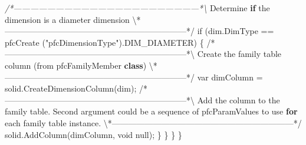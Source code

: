 \documentclass[]{article}
\newenvironment{Shaded}{}{}
\newcommand{\KeywordTok}[1]{\textcolor[rgb]{0.00,0.44,0.13}{\textbf{{#1}}}}
\newcommand{\FloatTok}[1]{\textcolor[rgb]{0.25,0.63,0.44}{{#1}}}
\newcommand{\CommentTok}[1]{\textcolor[rgb]{0.38,0.63,0.69}{\textit{{#1}}}}
\newcommand{\OtherTok}[1]{\textcolor[rgb]{0.00,0.44,0.13}{{#1}}}
\newcommand{\FunctionTok}[1]{\textcolor[rgb]{0.02,0.16,0.49}{{#1}}}
\newcommand{\NormalTok}[1]{{#1}}
\begin{document}
\begin{Shaded}
\begin{Highlighting}[]
\CommentTok{/*------------------------------------------------------------------*\textbackslash{}}
  \NormalTok{Determine }\KeywordTok{if} \NormalTok{the dimension is a diameter dimension}
\NormalTok{\textbackslash{}*------------------------------------------------------------------*}\OtherTok{/          }
\OtherTok{      if }\FloatTok{(}\OtherTok{dim.DimType == pfcCreate }\FloatTok{(}\OtherTok{"pfcDimensionType"}\FloatTok{)}\OtherTok{.DIM_DIAMETER}\FloatTok{)}\OtherTok{ }
\OtherTok{        \{}
\OtherTok{/}\NormalTok{*------------------------------------------------------------------*\textbackslash{}}
  \NormalTok{Create the family table }\FunctionTok{column} \NormalTok{(from pfcFamilyMember }\KeywordTok{class}\NormalTok{)}
\NormalTok{\textbackslash{}*------------------------------------------------------------------*}\OtherTok{/            }
\OtherTok{          var dimColumn = solid.CreateDimensionColumn}\FloatTok{(}\OtherTok{dim}\FloatTok{)}\OtherTok{;}
\OtherTok{/}\NormalTok{*------------------------------------------------------------------*\textbackslash{}}
  \NormalTok{Add the column to the family }\OtherTok{table}\NormalTok{.  }\FunctionTok{Second} \FunctionTok{argument} \FunctionTok{could} \FunctionTok{be}
  \NormalTok{a sequence of pfcParamValues to use }\KeywordTok{for} \NormalTok{each family table }\OtherTok{instance}\NormalTok{.}
\NormalTok{\textbackslash{}*------------------------------------------------------------------*}\OtherTok{/        }
\OtherTok{          solid.AddColumn}\FloatTok{(}\OtherTok{dimColumn, void null}\FloatTok{)}\OtherTok{;}
\OtherTok{        \}}
\OtherTok{    \}}
\OtherTok{    \}}
\OtherTok{\}}
\end{Highlighting}
\end{Shaded}
\end{document}

